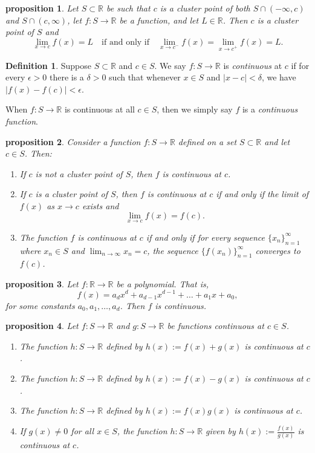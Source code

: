 \documentclass{article}
\newtheorem{proposition}{Proposition}[section]
\newtheorem{proposition}{proposition}[section]
\theoremstyle{definition}
\newtheorem{definition}{Definition}[section]
\theoremstyle{remark}
\begin{document}
\begin{proposition}
Let $S \subset \mathbb{R}$ be such that $c$ is a cluster point of both $S \cap (-\infty, c)$ and $S \cap (c, \infty)$, let $f : S \to \mathbb{R}$ be a function, and let $L \in \mathbb{R}$. Then $c$ is a cluster point of $S$ and
\[
\lim_{x\to c} f(x) = L \quad \text{if and only if} \quad \lim_{x\to c^-} f(x) = \lim_{x\to c^+} f(x) = L.
\]
\end{proposition}

\begin{definition}
Suppose $S \subset \mathbb{R}$ and $c \in S$. We say $f : S \to \mathbb{R}$ is \textit{continuous} at $c$ if for every $\epsilon > 0$ there is a $\delta > 0$ such that whenever $x \in S$ and $|x - c| < \delta$, we have $|f(x) - f(c)| < \epsilon$.

When $f : S \to \mathbb{R}$ is continuous at all $c \in S$, then we simply say $f$ is a \textit{continuous function}.
\end{definition}


\begin{proposition}
Consider a function $f : S \to \mathbb{R}$ defined on a set $S \subset \mathbb{R}$ and let $c \in S$. Then:
\begin{enumerate}
\item If $c$ is not a cluster point of $S$, then $f$ is continuous at $c$.
\item If $c$ is a cluster point of $S$, then $f$ is continuous at $c$ if and only if the limit of $f(x)$ as $x \to c$ exists and
\[
\lim_{x\to c} f(x) = f(c).
\]
\item The function $f$ is continuous at $c$ if and only if for every sequence $\{x_n\}_{n=1}^{\infty}$ where $x_n \in S$ and $\lim_{n\to\infty} x_n = c$, the sequence $\{f(x_n)\}_{n=1}^{\infty}$ converges to $f(c)$.
\end{enumerate}
\end{proposition}

\begin{proposition}
Let $f : \mathbb{R} \to \mathbb{R}$ be a polynomial. That is,
\[
f(x) = a_d x^d + a_{d-1} x^{d-1} + \dots + a_1 x + a_0,
\]
for some constants $a_0, a_1, \dots, a_d$. Then $f$ is continuous.
\end{proposition}

\begin{proposition}
Let $f : S \to \mathbb{R}$ and $g : S \to \mathbb{R}$ be functions continuous at $c \in S$.
\begin{enumerate}
\item The function $h: S \to \mathbb{R}$ defined by $h(x) := f(x) + g(x)$ is continuous at $c$.
\item The function $h: S \to \mathbb{R}$ defined by $h(x) := f(x) - g(x)$ is continuous at $c$.
\item The function $h: S \to \mathbb{R}$ defined by $h(x) := f(x)g(x)$ is continuous at $c$.
\item If $g(x) \neq 0$ for all $x \in S$, the function $h: S \to \mathbb{R}$ given by $h(x) := \frac{f(x)}{g(x)}$ is continuous at $c$.
\end{enumerate}
\end{proposition}
\end{document}
